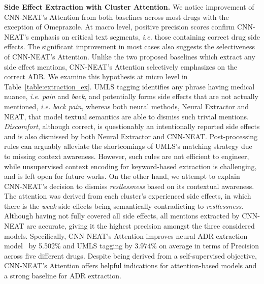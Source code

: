 \documentclass{bmcart}
\begin{document}
{\bf Side Effect Extraction with Cluster Attention.} We notice improvement of CNN-NEAT's Attention from both baselines across most drugs with the exception of Omeprazole. At macro level, positive precision scores confirm CNN-NEAT's emphasis on critical text segments, \textit{i.e.} those containing correct drug side effects. The significant improvement in most cases also suggests the selectiveness of CNN-NEAT's Attention. Unlike the two proposed baselines which extract any side effect mentions, CNN-NEAT's Attention selectively emphasizes on the correct ADR. We examine this hypothesis at micro level in Table~\ref{table:extraction_ex}. UMLS tagging identifies any phrase having medical nuance, \textit{i.e.} \textit{pain} and \textit{back}, and potentially forms side effects that are not actually mentioned, \textit{i.e.} \textit{back pain}, whereas both neural methods, Neural Extractor and NEAT, that model textual semantics are able to dismiss such trivial mentions. \textit{Discomfort}, although correct, is questionably an intentionally reported side effects and is also dismissed by both Neural Extractor and CNN-NEAT. Post-processing rules can arguably alleviate the shortcomings of UMLS's matching strategy due to missing context awareness. However, such rules are not efficient to engineer, while unsupervised context encoding for keyword-based extraction is challenging, and is left open for future works. On the other hand, we attempt to explain CNN-NEAT's decision to dismiss \textit{restlessness} based on its contextual awareness. The attention was derived from each cluster's experienced side effects, in which there is the \textit{weak} side effects being semantically contradicting to \textit{restlessness}. Although having not fully covered all side effects, all mentions extracted by CNN-NEAT are accurate, giving it the highest precision amongst the three considered models. Specifically, CNN-NEAT's Attention improves neural ADR extraction model~\cite{ding2018attentive} by 5.502\% and UMLS tagging by 3.974\% on average in terms of Precision across five different drugs. Despite being derived from a self-supervised objective, CNN-NEAT's Attention offers helpful indications for attention-based models and a strong baseline for ADR extraction. \\
\end{document}

